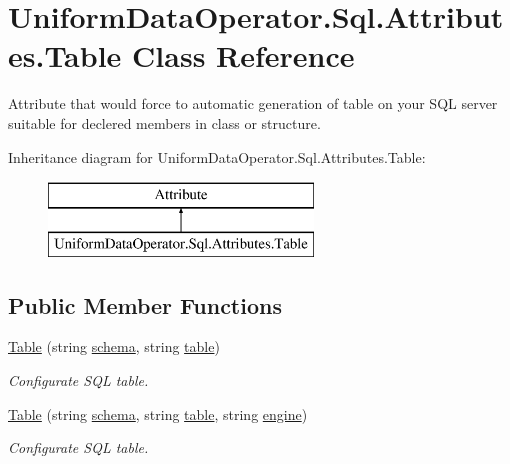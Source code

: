 \hypertarget{class_uniform_data_operator_1_1_sql_1_1_attributes_1_1_table}{}\section{Uniform\+Data\+Operator.\+Sql.\+Attributes.\+Table Class Reference}
\label{class_uniform_data_operator_1_1_sql_1_1_attributes_1_1_table}


Attribute that would force to automatic generation of table on your S\+QL server suitable for declered members in class or structure.  


Inheritance diagram for Uniform\+Data\+Operator.\+Sql.\+Attributes.\+Table\+:\begin{figure}[H]
\begin{center}
\leavevmode
\includegraphics[height=2.000000cm]{dd/deb/class_uniform_data_operator_1_1_sql_1_1_attributes_1_1_table}
\end{center}
\end{figure}
\subsection*{Public Member Functions}
\begin{DoxyCompactItemize}
\item 
\mbox{\hyperlink{class_uniform_data_operator_1_1_sql_1_1_attributes_1_1_table_ad56af3278ca73f930b84b9dcbe777d5d}{Table}} (string \mbox{\hyperlink{class_uniform_data_operator_1_1_sql_1_1_attributes_1_1_table_a8390d02fa5d0b96ffd6e8f40cafefb7d}{schema}}, string \mbox{\hyperlink{class_uniform_data_operator_1_1_sql_1_1_attributes_1_1_table_ab413ed3bf0c1b110cf4b05cdea966de5}{table}})
\begin{DoxyCompactList}\small\item\em Configurate S\+QL table. \end{DoxyCompactList}\item 
\mbox{\hyperlink{class_uniform_data_operator_1_1_sql_1_1_attributes_1_1_table_a5c66b02de1ddfe8cd11ee4585ec77d82}{Table}} (string \mbox{\hyperlink{class_uniform_data_operator_1_1_sql_1_1_attributes_1_1_table_a8390d02fa5d0b96ffd6e8f40cafefb7d}{schema}}, string \mbox{\hyperlink{class_uniform_data_operator_1_1_sql_1_1_attributes_1_1_table_ab413ed3bf0c1b110cf4b05cdea966de5}{table}}, string \mbox{\hyperlink{class_uniform_data_operator_1_1_sql_1_1_attributes_1_1_table_afe0c2479401391900b1b16055a090e07}{engine}})
\begin{DoxyCompactList}\small\item\em Configurate S\+QL table. \end{DoxyCompactList}\end{DoxyCompactItemize}
